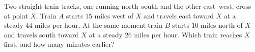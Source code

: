 Two straight train tracks, one running north--south and the other east--west, cross at point $X$. Train $A$ starts $15$ miles west of $X$ and travels east toward $X$ at a steady $44$ miles per hour. At the same moment train $B$ starts $10$ miles north of $X$ and travels south toward $X$ at a steady $26$ miles per hour. Which train reaches $X$ first, and how many minutes earlier?
